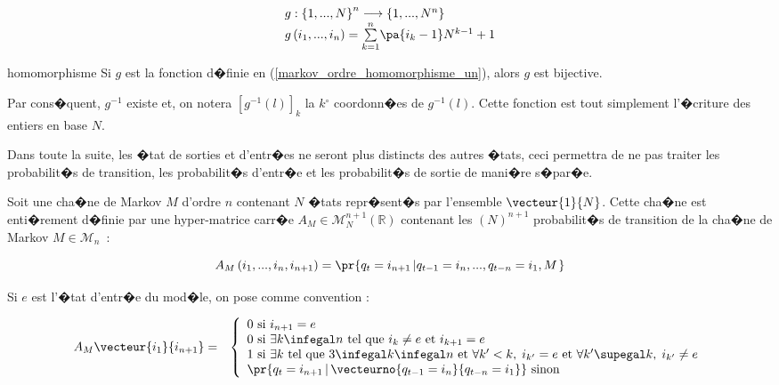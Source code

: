         \begin{eqnarray}
        \begin{array}{l}
        g:\left\{  1,...,N\right\}  ^{n}\longrightarrow\left\{  1,...,N^{n}\right\}\\
        g\left(  i_{1},...,i_{n}\right)  =\underset{k=1}{\overset{n}{\sum}}\pa{i_{k}-1}N^{k-1}+1
        \end{array}
        \label{markov_ordre_homomorphisme_un}
        \end{eqnarray}

        \begin{xproperty}{homomorphisme}
        \label{propriete_chaine_ordre_n_1}%
        Si $g$ est la fonction d�finie en (\ref{markov_ordre_homomorphisme_un}), alors $g$ est bijective.
        \end{xproperty}


Par cons�quent, $g^{-1}$ existe et, on notera $\left[g^{-1}\left(l\right)\right]  _{k}$ la $k{{}^\circ}$ coordonn�es de $g^{-1}\left(l\right)$. Cette fonction est tout simplement l'�criture des entiers en base $N$.

Dans toute la suite, les �tat de sorties et d'entr�es ne seront plus distincts des autres �tats, ceci permettra de ne pas traiter les probabilit�s de transition, les probabilit�s d'entr�e et les probabilit�s de sortie de mani�re s�par�e.


Soit une cha�ne de Markov $M$ d'ordre $n$ contenant $N$ �tats repr�sent�s par l'ensemble $\vecteur{1}{N}$. Cette cha�ne est enti�rement d�finie par une hyper-matrice carr�e $A_{M}\in\mathcal{M}_{N}^{n+1}\left(\mathbb{R}\right)  $ contenant les $\left( N\right)^{n+1}$ probabilit�s de transition de la cha�ne de Markov $M\in\mathcal{M}_{n}$~:

        $$
        A_{M}\left(i_{1},...,i_{n},i_{n+1}\right)  =\pr{  q_{t}=i_{n+1}\left| 
         q_{t-1}=i_{n},...,q_{t-n}=i_{1},M\right.  }
        $$

Si $e$ est l'�tat d'entr�e du mod�le, on pose comme convention :

        \begin{eqnarray}
        A_M \vecteur{i_1}{i_{n+1}} &=& \left \{
        \begin{array}{l}
        0 \text{ si } i_{n+1} = e \\
        0 \text{ si } \exists k \infegal n \text{ tel que } i_k \neq e \text{ et } i_{k+1} = e \\
        1 \text{ si } \exists k \text{ tel que }  3 \infegal k \infegal n \text{ et } \forall k' < k, \; i_{k'} =
                 e \text { et } \forall k' \supegal k, \; i_{k'} \neq e \\
        \pr{q_t = i_{n+1} \, | \, \vecteurno{q_{t-1} = i_n}{q_{t-n} = i_1}} \text{ sinon}
        \end{array}
        \right. \label{hmm_equation_convention_ordre}
        \end{eqnarray}

